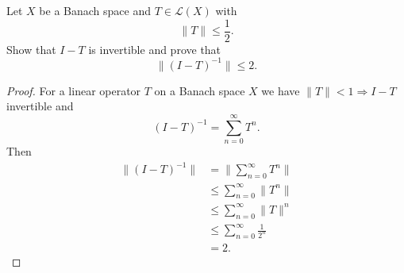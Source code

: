 \begin{prob}
    Let $X$ be a Banach space and $T \in \mathcal L(X)$ with 
    \[
        \|T\| \leq \frac{1}{2}.
    \]
    Show that $I - T$ is invertible and prove that 
    \[
        \|(I - T)^{-1}\| \leq 2.
    \]
\end{prob}
\begin{proof}
    For a linear operator $T$ on a Banach space $X$ we 
    have $\|T\| < 1 \Rightarrow I - T$ invertible and 
    \[
        (I-T)^{-1} 
        = \sum_{n=0}^\infty T^n.
    \]
    Then 
    \begin{align*}
        \|(I-T)^{-1}\| 
        &= 
        \|\sum_{n=0}^\infty T^n\| \\ 
        &\leq 
        \sum_{n=0}^\infty \|T^n\| \\ 
        &\leq \sum_{n=0}^\infty \|T\|^n \\ 
        &\leq \sum_{n=0}^\infty \frac{1}{2^n}
        \\ 
        &= 2.
    \end{align*}
\end{proof}

